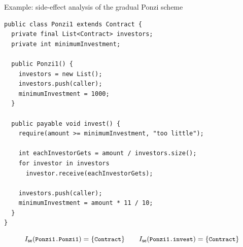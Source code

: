 \documentclass[11pt]{beamer}  %
\def\codesize{\small}
\def\<#1>{\codeid{#1}}
\newcommand{\codeid}[1]{\ifmmode{\mbox{\codesize\ttfamily{#1}}}\else{\codesize\ttfamily #1}\fi}
\newcommand{\intsideeffect}{I_{\mathsf{se}}}
\begin{document}
\begin{frame}[fragile]{Example: side-effect analysis of the gradual Ponzi scheme}

  \begin{center}
    \begin{minipage}{0.95\textwidth}
      \begin{lstlisting}[language=pseudo]
public class Ponzi1 extends Contract {
  private final List<Contract> investors;
  private int minimumInvestment;

  public Ponzi1() {
    investors = new List();
    investors.push(caller);
    minimumInvestment = 1000;
  }

  public payable void invest() {
    require(amount >= minimumInvestment, "too little");

    int eachInvestorGets = amount / investors.size();
    for investor in investors
      investor.receive(eachInvestorGets);

    investors.push(caller);
    minimumInvestment = amount * 11 / 10;
  }
}
      \end{lstlisting}
    \end{minipage}
  \end{center}

  \vspace*{-3ex}
  \[\intsideeffect(\<Ponzi1.Ponzi1>)=\{\<Contract>\}\qquad\intsideeffect(\<Ponzi1.invest>)=\{\<Contract>\}\]

\end{frame}
\end{document}
